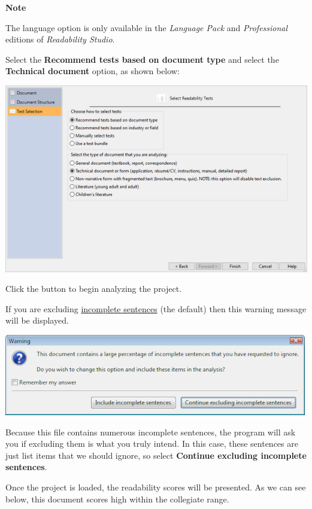 \documentclass[
]{book}
\newenvironment{notesection}
    {
    \begin{tcolorbox}[colframe=mediumblue,colback=lightblue,coltext=mediumblue,arc=3mm]
    \faLightbulb[regular] \textbf{Note} \newline
    }
    {
    \end{tcolorbox}
    }
\theoremstyle{definition}
\theoremstyle{definition}
\theoremstyle{definition}
\theoremstyle{definition}
\theoremstyle{remark}
\begin{document}
\begin{notesection}
The language option is only available in the \emph{Language Pack} and \emph{Professional} editions of \emph{Readability Studio}.

\end{notesection}

Select the \textbf{Recommend tests based on document type} and select the \textbf{Technical document} option, as shown below:

\includegraphics{Images/wizarddoctypetechselected.png}

Click the  button to begin analyzing the project.

If you are excluding \protect\hyperlink{how-text-is-excluded}{incomplete sentences} (the default) then this warning message will be displayed.

\begin{center}\includegraphics[width=0.5\linewidth,]{Images/NonGenerated/sentencewarning} \end{center}

Because this file contains numerous incomplete sentences, the program will ask you if excluding them is what you truly intend. In this case, these sentences are just list items that we should ignore, so select \textbf{Continue excluding incomplete sentences}.

Once the project is loaded, the readability scores will be presented. As we can see below, this document scores high within the collegiate range.
\end{document}
